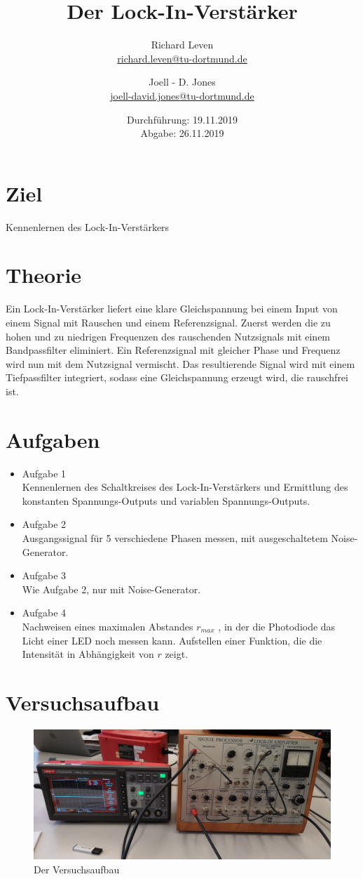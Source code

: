 \documentclass[captions=tableheading]{scrartcl}
\title{Der Lock-In-Verstärker}
\author{Richard Leven \\ \href{mailto:richard.leven@tu-dortmund.de}{richard.leven@tu-dortmund.de}
 \and Joell - D. Jones \\ \href{mailto:joell-david.jones@tu-dortmund.de}{joell-david.jones@tu-dortmund.de}}
\date{
    Durchführung: 19.11.2019\\
    Abgabe: 26.11.2019
}
\begin{document}
\maketitle
\newpage
\section{Ziel}
Kennenlernen des Lock-In-Verstärkers
\section{Theorie}
Ein Lock-In-Verstärker liefert eine klare Gleichspannung bei einem Input von einem Signal mit Rauschen und einem Referenzsignal.
Zuerst werden die zu hohen und zu niedrigen Frequenzen des rauschenden Nutzsignals mit einem Bandpassfilter eliminiert.
Ein Referenzsignal mit gleicher Phase und Frequenz wird nun mit dem Nutzsignal vermischt.
Das resultierende Signal wird mit einem Tiefpassfilter integriert, sodass eine Gleichspannung erzeugt wird, die rauschfrei ist.
\section{Aufgaben}
    \begin{itemize}
        \item{Aufgabe 1 \\}
        Kennenlernen des Schaltkreises des Lock-In-Verstärkers und Ermittlung des konstanten Spannungs-Outputs und variablen Spannungs-Outputs.
        \item{Aufgabe 2 \\}
        Ausgangssignal für 5 verschiedene Phasen messen, mit ausgeschaltetem Noise-Generator.
        \item{Aufgabe 3 \\}
        Wie Aufgabe 2, nur mit Noise-Generator.
        \item{Aufgabe 4 \\}
        Nachweisen eines maximalen Abstandes \(r_{max}\) , in der die Photodiode das Licht einer LED noch messen kann.
        Aufstellen einer Funktion, die die Intensität in Abhängigkeit von \(r\) zeigt.
    \end{itemize}
\section{Versuchsaufbau}

\begin{figure}
\centering
\includegraphics[scale=0.07]{Lock_In Bilder/Versauf.jpg}
\caption{Der Versuchsaufbau}
\label{fig:versau}
\end{figure}
\newpage
\end{document}

